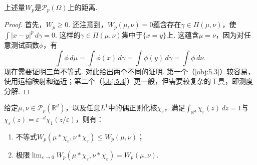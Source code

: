 \begin{proposition}\label{obj:5.1}
上述量$W_p$是$\mathscr P_p(\Omega)$上的距离.
\end{proposition}
\begin{proof}
首先，$W_p\ge0$. 还注意到，$W_p(\mu,\nu)=0$蕴含存在$\gamma\in\Pi(\mu,\nu)$，使$\int|x-y|^p\,d\gamma=0$. 这样的$\gamma\in\Pi(\mu,\nu)$集中于$\{x=y\}$上. 这蕴含$\mu=\nu$，因为对任意测试函数$\phi$，有
\[
\int\phi\,d\mu=\int\phi(x)\,d\gamma=\int\phi(y)\,d\gamma=\int\phi\,d\nu.
\]
现在需要证明三角不等式. 对此给出两个不同的证明. 第一个（\autoref{obj:5.3}）较容易，使用运输映射和逼近；第二个（\autoref{obj:5.4}）更一般，但需要较复杂的工具，即测度分解.
\end{proof}

\begin{lemma}\label{obj:5.2}
给定$\mu,\nu\in\mathscr P_p(\mathbb R^d)$，以及任意$L^1$中的偶正则化核$\chi_\varepsilon$，满足$\int_{\mathbb R^d}\chi_\varepsilon(z)\,dz=1$与$\chi_\varepsilon(z)=\varepsilon^{-d}\chi_1(z/\varepsilon)$，则有：
\begin{enumerate}
\item 不等式$W_p(\mu*\chi_\varepsilon,\nu*\chi_\varepsilon)\le W_p(\mu,\nu)$；
\item 极限$\lim_{\varepsilon\to0}W_p(\mu*\chi_\varepsilon,\nu*\chi_\varepsilon)=W_p(\mu,\nu)$.
\end{enumerate}
\end{lemma}
